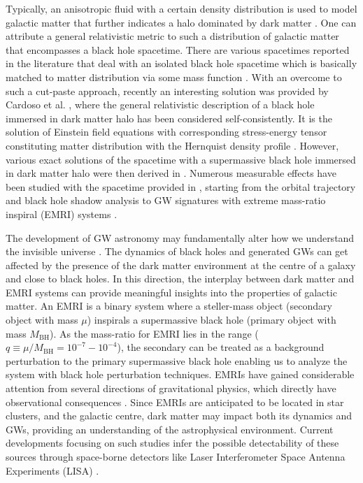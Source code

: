 \documentclass[11pt]{article}
\begin{document}
Typically, an anisotropic fluid with a certain density distribution is used to model galactic matter that further indicates a halo dominated by dark matter \cite{BENSON201033}. One can attribute a general relativistic metric to such a distribution of galactic matter that encompasses a black hole spacetime. There are various spacetimes reported in the literature that deal with an isolated black hole spacetime which is basically matched to matter distribution via some mass function \cite{Xu_2018, PhysRevD.104.124082, PhysRevD.104.104042, Jusufi2020, Hou_2018, KONOPLYA20191}. With an overcome to such a cut-paste approach, recently an interesting solution was provided by Cardoso et al. \cite{PhysRevD.105.L061501}, where the general relativistic description of a black hole immersed in dark matter halo has been considered self-consistently. It is the solution of Einstein field equations with corresponding stress-energy tensor constituting matter distribution with the Hernquist density profile \cite{1990ApJ...356..359H}. However, various exact solutions of the spacetime with a supermassive black hole immersed in dark matter halo were then derived in \cite{Konoplya:2022hbl}. Numerous measurable effects have been studied with the spacetime provided in \cite{PhysRevD.105.L061501}, starting from the orbital trajectory and black hole shadow analysis to GW signatures with extreme mass-ratio inspiral (EMRI) systems \cite{Konoplya:2022hbl, Dai:2023cft, Xavier:2023exm, Stuchlik:2021gwg, Figueiredo:2023gas, Cardoso:2022whc, Destounis:2022obl}.

The development of GW astronomy may fundamentally alter how we understand the invisible universe \cite{LIGOScientific:2016aoc, LIGOScientific:2017vox}. The dynamics of black holes and generated GWs can get affected by the presence of the dark matter environment at the centre of a galaxy and close to black holes. In this direction, the interplay between dark matter and EMRI systems can provide meaningful insights into the properties of galactic matter. An EMRI is a binary system where a steller-mass object (secondary object with mass $\mu$) inspirals a supermassive black hole (primary object with mass $M_{\textrm{BH}}$). As the mass-ratio for EMRI lies in the range ($q \equiv \mu/M_{\textrm{BH}} = 10^{-7} - 10^{-4}$), the secondary can be treated as a background perturbation to the primary supermassive black hole enabling us to analyze the system with black hole perturbation techniques. EMRIs have gained considerable attention from several directions of gravitational physics, which directly have observational consequences \cite{Babak:2017tow, Amaro-Seoane:2007osp, Barack:2009ux, Hinderer:2008dm, Drasco:2005kz, Gair:2004iv, Sopuerta:2009iy,Rahman:2021eay, Rahman:2022fay,Fan:2022wio,Liang:2022gdk,Maselli:2021men,Drummond:2023loz, PhysRevD.102.024041}. Since EMRIs are anticipated to be located in star clusters, and the galactic centre, dark matter may impact both its dynamics and GWs, providing an understanding of the astrophysical environment. Current developments focusing on such studies infer the possible detectability of these sources through space-borne detectors like Laser Interferometer Space Antenna Experiments (LISA) \cite{Gair:2017ynp, Babak:2017tow, LISA:2022kgy}.
\end{document}
